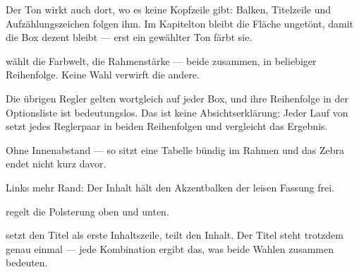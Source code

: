 \begin{defbox}[Derselbe Regler, rahmenlos\ZSFTitleTag{tone=neutral}][weight=quiet, tone=neutral]
  Der Ton wirkt auch dort, wo es keine Kopfzeile gibt: Balken, Titelzeile und
  Aufzählungszeichen folgen ihm. Im Kapitelton bleibt die Fläche ungetönt,
  damit die Box dezent bleibt — erst ein gewählter Ton färbt sie.
\end{defbox}

\begin{defbox}
   wählt die Farbwelt,  die Rahmenstärke
  — beide zusammen, in beliebiger Reihenfolge. Keine Wahl verwirft die andere.
\end{defbox}


\begin{runintext}
  Die übrigen Regler gelten wortgleich auf jeder Box, und ihre Reihenfolge in
  der Optionsliste ist bedeutungslos. Das ist keine Absichtserklärung: Jeder
  Lauf von  setzt jedes Reglerpaar in beiden Reihenfolgen
  und vergleicht das Ergebnis.
\end{runintext}

\begin{defbox}[Inhalt bis an die Kante\ZSFTitleTag{padx=none, pady=none}][padx=none, pady=none]
  Ohne Innenabstand — so sitzt eine Tabelle bündig im Rahmen und das Zebra
  endet nicht kurz davor.
\end{defbox}

\begin{defbox}[Platz für den Balken\ZSFTitleTag{padx=bar}][padx=bar]
  Links mehr Rand: Der Inhalt hält den Akzentbalken der leisen Fassung frei.
\end{defbox}

\begin{defbox}[Knappste Höhe\ZSFTitleTag{pady=tight}][pady=tight]
   regelt die Polsterung oben und unten.
\end{defbox}

\begin{defbox}
   setzt den Titel als erste Inhaltszeile,
   teilt den Inhalt.
  \tcblower
  Der Titel steht trotzdem genau einmal — jede Kombination ergibt das, was
  beide Wahlen zusammen bedeuten.
\end{defbox}

